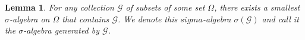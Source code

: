 \documentclass[a4paper,11pt]{article}
\theoremstyle{plain}
\newtheorem{lemma}[theorem]{Lemma}
\theoremstyle{definition}
\begin{document}
\begin{lemma}
For any collection $\mathcal{G}$ of subsets of some set $\Omega$, there exists a smallest $\sigma$-algebra on $\Omega$ that contains $\mathcal{G}$. We denote this $sigma$-algebra $\sigma(\mathcal{G})$ and call it the $\sigma$-algebra generated by $\mathcal{G}$.
\end{lemma}

\end{document}
